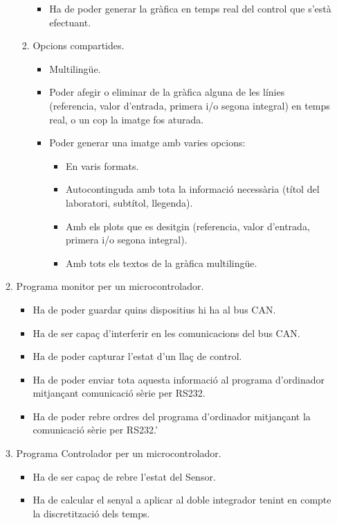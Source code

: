 \begin{enumerate}
\begin{enumerate}
\begin{enumerate}
\begin{itemize}
							\item Ha de poder generar la gràfica en temps real del control que s'està efectuant.
						\end{itemize}
					\item Opcions compartides.
						\begin{itemize}
							\item Multilingüe.
							\item Poder afegir o eliminar de la gràfica alguna de les línies (referencia, valor d'entrada, primera i/o segona integral) en temps real, o un cop la imatge fos aturada.
							\item Poder generar una imatge amb varies opcions:
								\begin{itemize}
									\item En varis formats.
									\item Autocontinguda amb tota la informació necessària (títol del laboratori, subtítol, llegenda).
									\item Amb els plots que es desitgin (referencia, valor d'entrada, primera i/o segona integral).
									\item Amb tots els textos de la gràfica multilingüe.
								\end{itemize}
						\end{itemize}
				\end{enumerate}
			\item Programa monitor per un microcontrolador.
				\begin{itemize}
					\item Ha de poder guardar quins dispositius hi ha al bus CAN.
					\item Ha de ser capaç d'interferir en les comunicacions del bus CAN.
					\item Ha de poder capturar l'estat d'un llaç de control.
					\item Ha de poder enviar tota aquesta informació al programa d'ordinador mitjançant comunicació sèrie per RS232.
					\item Ha de poder rebre ordres del programa d'ordinador mitjançant la comunicació sèrie per RS232.'
				\end{itemize}
			\item Programa Controlador per un microcontrolador.
				\begin{itemize}
					\item Ha de ser capaç de rebre l'estat del Sensor.
					\item Ha de calcular el senyal a aplicar al doble integrador tenint en compte la discretització dels temps.

\end{itemize}
\end{enumerate}
\end{enumerate}
